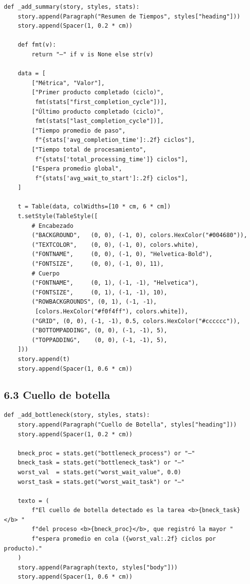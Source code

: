 \documentclass[12pt,letterpaper]{article}
\begin{document}
\begin{lstlisting}
def _add_summary(story, styles, stats):
    story.append(Paragraph("Resumen de Tiempos", styles["heading"]))
    story.append(Spacer(1, 0.2 * cm))

    def fmt(v):
        return "—" if v is None else str(v)

    data = [
        ["Métrica", "Valor"],
        ["Primer producto completado (ciclo)",
         fmt(stats["first_completion_cycle"])],
        ["Último producto completado (ciclo)",
         fmt(stats["last_completion_cycle"])],
        ["Tiempo promedio de paso",
         f"{stats['avg_completion_time']:.2f} ciclos"],
        ["Tiempo total de procesamiento",
         f"{stats['total_processing_time']} ciclos"],
        ["Espera promedio global",
         f"{stats['avg_wait_to_start']:.2f} ciclos"],
    ]

    t = Table(data, colWidths=[10 * cm, 6 * cm])
    t.setStyle(TableStyle([
        # Encabezado
        ("BACKGROUND",   (0, 0), (-1, 0), colors.HexColor("#004680")),
        ("TEXTCOLOR",    (0, 0), (-1, 0), colors.white),
        ("FONTNAME",     (0, 0), (-1, 0), "Helvetica-Bold"),
        ("FONTSIZE",     (0, 0), (-1, 0), 11),
        # Cuerpo
        ("FONTNAME",     (0, 1), (-1, -1), "Helvetica"),
        ("FONTSIZE",     (0, 1), (-1, -1), 10),
        ("ROWBACKGROUNDS", (0, 1), (-1, -1),
         [colors.HexColor("#f0f4ff"), colors.white]),
        ("GRID", (0, 0), (-1, -1), 0.5, colors.HexColor("#cccccc")),
        ("BOTTOMPADDING", (0, 0), (-1, -1), 5),
        ("TOPPADDING",    (0, 0), (-1, -1), 5),
    ]))
    story.append(t)
    story.append(Spacer(1, 0.6 * cm))
\end{lstlisting}

\subsection{6.3 Cuello de botella}

\begin{lstlisting}
def _add_bottleneck(story, styles, stats):
    story.append(Paragraph("Cuello de Botella", styles["heading"]))
    story.append(Spacer(1, 0.2 * cm))

    bneck_proc = stats.get("bottleneck_process") or "—"
    bneck_task = stats.get("bottleneck_task") or "—"
    worst_val  = stats.get("worst_wait_value", 0.0)
    worst_task = stats.get("worst_wait_task") or "—"

    texto = (
        f"El cuello de botella detectado es la tarea <b>{bneck_task}</b> "
        f"del proceso <b>{bneck_proc}</b>, que registró la mayor "
        f"espera promedio en cola ({worst_val:.2f} ciclos por producto)."
    )
    story.append(Paragraph(texto, styles["body"]))
    story.append(Spacer(1, 0.6 * cm))
\end{lstlisting}
\end{document}
